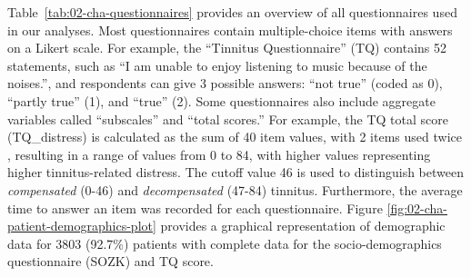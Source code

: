 \documentclass[
  oneside]{book}
\begin{document}
Table~\ref{tab:02-cha-questionnaires} provides an overview of all questionnaires used in our analyses.
Most questionnaires contain multiple-choice items with answers on a Likert scale. For example, the ``Tinnitus Questionnaire'' \autocite{GoebelHiller:TF1998} (TQ) contains 52 statements, such as ``I am unable to enjoy listening to music because of the noises.'', and respondents can give 3 possible answers: ``not true'' (coded as 0), ``partly true'' (1), and ``true'' (2).
Some questionnaires also include aggregate variables called ``subscales'' and ``total scores.''
For example, the TQ total score (TQ\_distress) is calculated as the sum of 40 item values, with 2 items used twice \autocite{GoebelHiller:TF1998}, resulting in a range of values from 0 to 84, with higher values representing higher tinnitus-related distress.
The cutoff value 46 \autocite{GoebelHiller:TF1998} is used to distinguish between \emph{compensated} (0-46) and \emph{decompensated} (47-84) tinnitus.
Furthermore, the average time to answer an item was recorded for each questionnaire.
Figure \ref{fig:02-cha-patient-demographics-plot} provides a graphical representation of demographic data for 3803 (92.7\%) patients with complete data for the socio-demographics questionnaire \autocite{brueggemann:sozk-reference} (SOZK) and TQ score.
\end{document}
